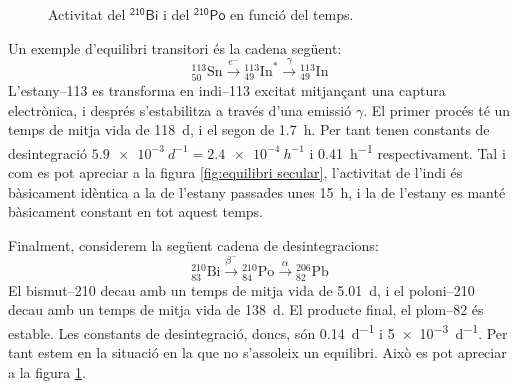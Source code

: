 \documentclass[12pt]{article}
\begin{document}
\begin{figure}[htb]
	\center
	
	\caption{Activitat del \( \mathsf{{}^{210}\text{Bi}} \) i del \( \mathsf{{}^{210}\text{Po}} \) en funció del temps.}
	\label{fig:no equilibri}
\end{figure}
Un exemple d'equilibri transitori és la cadena següent:
\begin{equation*}
	{}^{113}_{50}\text{Sn} \xrightarrow{e^-} {}^{113}_{49}\text{In}^{\ast} \xrightarrow{\gamma} {}^{113}_{49}\text{In}
\end{equation*}
L'estany--113 es transforma en indi--113 excitat mitjançant una captura electrònica, i després s'estabilitza a través d'una emissió \( \gamma \). El primer procés té un temps de mitja vida de \SI{118}{d}, i el segon de \SI{1.7}{h}. Per tant tenen constants de desintegració \( \SI{5.9e-3}{d^{-1}} = \SI{2.4e-4}{h^{-1}} \) i \SI{0.41}{h^{-1}} respectivament. Tal i com es pot apreciar a la figura \ref{fig:equilibri secular}, l'activitat de l'indi és bàsicament idèntica a la de l'estany passades unes \SI{15}{h}, i la de l'estany es manté bàsicament constant en tot aquest temps. 

Finalment, considerem la següent cadena de desintegracions:
\begin{equation*}
	{}^{210}_{83}\text{Bi} \xrightarrow{\beta^-} {}^{210}_{84}\text{Po} \xrightarrow{\alpha} {}^{206}_{82}\text{Pb}
\end{equation*}
El bismut--210 decau amb un temps de mitja vida de \SI{5.01}{d}, i el poloni--210 decau amb un temps de mitja vida de \SI{138}{d}. El producte final, el plom--82 és estable. Les constants de desintegració, doncs, són \SI{0,14}{d^{-1}} i \SI{5e-3}{d^{-1}}. Per tant estem en la situació en la que no s'assoleix un equilibri. Això es pot apreciar a la figura \ref{fig:no equilibri}.
\end{document}
